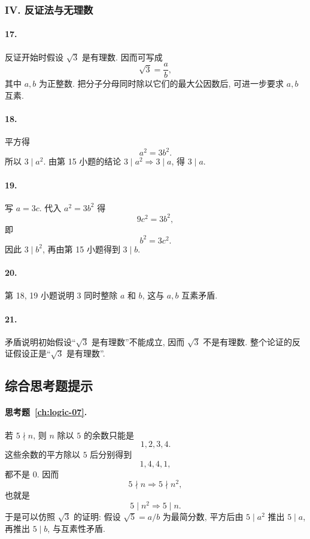 \documentclass[usesamecnt, thmcnt=section, lang=cn, newtx, 10pt, scheme=chinese]{elegantbook}
\begin{document}
\subsubsection*{IV. 反证法与无理数}

\paragraph*{17.}
反证开始时假设 $\sqrt3$ 是有理数. 因而可写成
\[
 \sqrt3=\frac ab,
\]
其中 $a,b$ 为正整数. 把分子分母同时除以它们的最大公因数后, 可进一步要求 $a,b$ 互素.

\paragraph*{18.}
平方得
\[
 a^2=3b^2.
\]
所以 $3\mid a^2$. 由第 15 小题的结论 $3\mid a^2\Rightarrow3\mid a$, 得 $3\mid a$.

\paragraph*{19.}
写 $a=3c$. 代入 $a^2=3b^2$ 得
\[
 9c^2=3b^2,
\]
即
\[
 b^2=3c^2.
\]
因此 $3\mid b^2$, 再由第 15 小题得到 $3\mid b$.

\paragraph*{20.}
第 18, 19 小题说明 $3$ 同时整除 $a$ 和 $b$, 这与 $a,b$ 互素矛盾.

\paragraph*{21.}
矛盾说明初始假设``$\sqrt3$ 是有理数''不能成立, 因而 $\sqrt3$ 不是有理数. 整个论证的反证假设正是``$\sqrt3$ 是有理数''.

\subsection*{综合思考题提示}

\paragraph*{思考题~\ref{ch:logic-07}.}
若 $5\nmid n$, 则 $n$ 除以 $5$ 的余数只能是
\[
 1,2,3,4.
\]
这些余数的平方除以 $5$ 后分别得到
\[
 1,4,4,1,
\]
都不是 $0$. 因而
\[
 5\nmid n\Rightarrow5\nmid n^2,
\]
也就是
\[
 5\mid n^2\Rightarrow5\mid n.
\]
于是可以仿照 $\sqrt3$ 的证明: 假设 $\sqrt5=a/b$ 为最简分数, 平方后由 $5\mid a^2$ 推出 $5\mid a$, 再推出 $5\mid b$, 与互素性矛盾.
\end{document}
